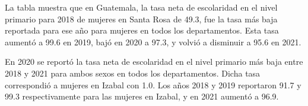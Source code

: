 La tabla muestra que en Guatemala, la tasa neta de escolaridad en el nivel primario para 2018 de mujeres en Santa Rosa de 49.3, fue la tasa más baja reportada para ese año para mujeres en todos los departamentos. Esta tasa aumentó a 99.6 en 2019, bajó en 2020 a 97.3, y volvió a disminuir a 95.6 en 2021. 

En 2020 se reportó la tasa neta de escolaridad en el nivel primario más baja entre 2018 y 2021 para ambos sexos en todos los departamentos. Dicha tasa correspondió a mujeres en Izabal con 1.0. Los años 2018 y 2019 reportaron 91.7 y 99.3 respectivamente para las mujeres en Izabal, y en 2021 aumentó a 96.9.  